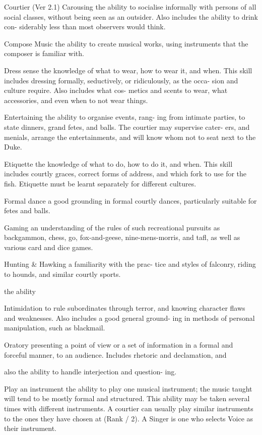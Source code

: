 \begin{Chapter}{Courtier (Ver 2.1)}
Carousing  the  ability  to  socialise  informally  with 
persons of all social classes, without being seen as 
an outsider. Also includes the ability to drink con-
siderably less than most observers would think. 

Compose  Music  the  ability  to  create  musical 
works,  using  instruments  that  the  composer  is 
familiar with. 

Dress  sense  the  knowledge  of  what  to  wear,  how 
to  wear  it,  and  when.  This  skill  includes  dressing 
formally,  seductively,  or  ridiculously,  as  the  occa-
sion  and  culture  require.  Also  includes  what  cos-
metics  and  scents  to  wear,  what  accessories,  and 
even when to not wear things. 

Entertaining  the  ability  to  organise  events,  rang-
ing  from  intimate  parties,  to  state  dinners,  grand 
fetes,  and  balls.  The  courtier  may  supervise  cater-
ers,  and  menials,  arrange  the  entertainments,  and 
will know whom not to seat next to the Duke. 

Etiquette the knowledge of what to do, how to do 
it,  and  when.  This  skill  includes  courtly  graces, 
correct forms of address, and which fork to use for 
the  fish.  Etiquette  must  be  learnt  separately  for 
different cultures. 

Formal dance a good grounding in formal courtly 
dances, particularly suitable for fetes and balls. 

Gaming  an  understanding  of  the  rules  of  such 
recreational  pursuits  as  backgammon,  chess,  go, 
fox-and-geese,  nine-mens-morris,  and  tafl,  as  well 
as various card and dice games. 

Hunting  \&  Hawking  a  familiarity  with  the  prac-
tice  and  styles  of  falconry,  riding  to  hounds,  and 
similar courtly sports. 

the  ability 

Intimidation 
to  rule  subordinates 
through  terror,  and  knowing  character  flaws  and 
weaknesses. Also includes a good general ground-
ing  in  methods  of  personal  manipulation,  such  as 
blackmail. 

Oratory  presenting  a  point  of  view  or  a  set  of 
information in a formal and forceful manner, to an 
audience.  Includes  rhetoric  and  declamation,  and 

also the ability to handle interjection and question-
ing. 

Play an instrument the ability to play one musical 
instrument; the music taught will tend to be mostly 
formal  and  structured.  This  ability  may  be  taken 
several times with different instruments. A courtier 
can  usually  play  similar  instruments  to  the  ones 
they  have  chosen  at  (Rank  /  2).  A  Singer  is  one 
who selects Voice as their instrument. 


\end{Chapter}
